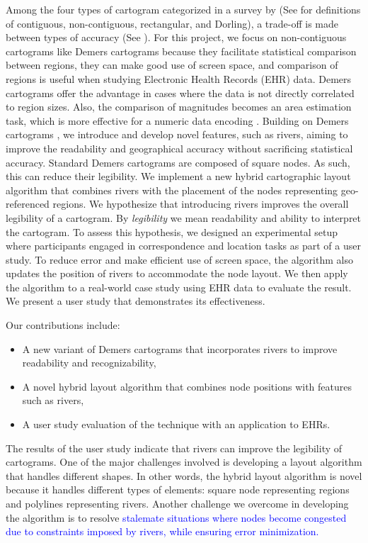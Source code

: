 \documentclass[Afour,sagev,times]{sagej}
\newcommand{\new}[1]{\textcolor{blue}{#1}}
\begin{document}
Among the four types of cartogram categorized in a survey by \citet{nusrat2016State} (See  for definitions of contiguous, non-contiguous, rectangular, and Dorling), a trade-off is made between types of accuracy (See ).
For this project, we focus on non-contiguous cartograms like Demers cartograms because they facilitate statistical comparison between regions, they can make good use of screen space, and comparison of regions is useful when studying Electronic Health Records (EHR) data.
Demers cartograms offer the advantage in cases where the data is not directly correlated to region sizes. Also, the comparison of magnitudes becomes an area estimation task, which is more effective for a numeric data encoding \cite{munzner2014Visualization}.
Building on Demers cartograms \cite{ian2002Cartogram}, we introduce and develop novel features, such as rivers, aiming to improve the readability and geographical accuracy without sacrificing statistical accuracy.
Standard Demers cartograms are composed of square nodes. As such, this can reduce their legibility.
We implement a new hybrid cartographic layout algorithm that combines rivers with the placement of the nodes representing geo-referenced regions.
We hypothesize that introducing rivers improves the overall legibility of a cartogram.
By \textit{legibility} we mean readability and ability to interpret the cartogram.
To assess this hypothesis, we designed an experimental setup where participants engaged in correspondence and location tasks as part of a user study.
To reduce error and make efficient use of screen space, the algorithm also updates the position of rivers to accommodate the node layout.
We then apply the algorithm to a real-world case study using EHR data to evaluate the result.
We present a user study that demonstrates its effectiveness.

Our contributions include:

\begin{itemize}
    \setlength\itemsep{0px}
    \item A new variant of Demers cartograms that incorporates rivers to improve readability and recognizability,
    \item A novel hybrid layout algorithm that combines node positions with features such as rivers,
    \item A user study evaluation of the technique with an application to EHRs.
\end{itemize}

The results of the user study indicate that rivers can improve the legibility of cartograms.
One of the major challenges involved is developing a layout algorithm that handles different shapes.
In other words, the hybrid layout algorithm is novel because it handles different types of elements: square node representing regions and polylines representing rivers.
Another challenge we overcome in developing the algorithm is to resolve \new{stalemate situations where nodes become congested due to constraints imposed by rivers, while ensuring error minimization.}
\end{document}
